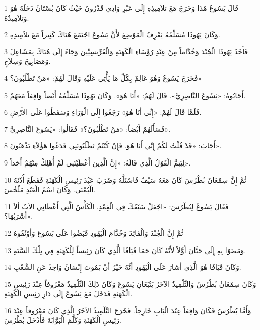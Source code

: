 \par 1 قَالَ يَسُوعُ هَذَا وَخَرَجَ مَعَ تلاَمِيذِهِ إِلَى عَبْرِ وَادِي قَدْرُونَ حَيْثُ كَانَ بُسْتَانٌ دَخَلَهُ هُوَ وَتلاَمِيذُهُ.
\par 2 وَكَانَ يَهُوذَا مُسَلِّمُهُ يَعْرِفُ الْمَوْضِعَ لأَنَّ يَسُوعَ اجْتَمَعَ هُنَاكَ كَثِيراً مَعَ تلاَمِيذِهِ.
\par 3 فَأَخَذَ يَهُوذَا الْجُنْدَ وَخُدَّاماً مِنْ عِنْدِ رُؤَسَاءِ الْكَهَنَةِ وَالْفَرِّيسِيِّينَ وَجَاءَ إِلَى هُنَاكَ بِمَشَاعِلَ وَمَصَابِيحَ وَسِلاَحٍ.
\par 4 فَخَرَجَ يَسُوعُ وَهُوَ عَالِمٌ بِكُلِّ مَا يَأْتِي عَلَيْهِ وَقَالَ لَهُمْ: «مَنْ تَطْلُبُونَ؟»
\par 5 أَجَابُوهُ: «يَسُوعَ النَّاصِرِيَّ». قَالَ لَهُمْ: «أَنَا هُوَ». وَكَانَ يَهُوذَا مُسَلِّمُهُ أَيْضاً وَاقِفاً مَعَهُمْ.
\par 6 فَلَمَّا قَالَ لَهُمْ: «إِنِّي أَنَا هُوَ» رَجَعُوا إِلَى الْوَرَاءِ وَسَقَطُوا عَلَى الأَرْضِ.
\par 7 فَسَأَلَهُمْ أَيْضاً: «مَنْ تَطْلُبُونَ؟» فَقَالُوا: «يَسُوعَ النَّاصِرِيَّ».
\par 8 أَجَابَ: «قَدْ قُلْتُ لَكُمْ إِنِّي أَنَا هُوَ. فَإِنْ كُنْتُمْ تَطْلُبُونَنِي فَدَعُوا هَؤُلاَءِ يَذْهَبُونَ».
\par 9 لِيَتِمَّ الْقَوْلُ الَّذِي قَالَهُ: «إِنَّ الَّذِينَ أَعْطَيْتَنِي لَمْ أُهْلِكْ مِنْهُمْ أَحَداً».
\par 10 ثُمَّ إِنَّ سِمْعَانَ بُطْرُسَ كَانَ مَعَهُ سَيْفٌ فَاسْتَلَّهُ وَضَرَبَ عَبْدَ رَئِيسِ الْكَهَنَةِ فَقَطَعَ أُذْنَهُ الْيُمْنَى. وَكَانَ اسْمُ الْعَبْدِ مَلْخُسَ.
\par 11 فَقَالَ يَسُوعُ لِبُطْرُسَ: «اجْعَلْ سَيْفَكَ فِي الْغِمْدِ. الْكَأْسُ الَّتِي أَعْطَانِي الآبُ ألاَ أَشْرَبُهَا؟».
\par 12 ثُمَّ إِنَّ الْجُنْدَ وَالْقَائِدَ وَخُدَّامَ الْيَهُودِ قَبَضُوا عَلَى يَسُوعَ وَأَوْثَقُوهُ
\par 13 وَمَضَوْا بِهِ إِلَى حَنَّانَ أَوَّلاً لأَنَّهُ كَانَ حَمَا قَيَافَا الَّذِي كَانَ رَئِيساً لِلْكَهَنَةِ فِي تِلْكَ السَّنَةِ.
\par 14 وَكَانَ قَيَافَا هُوَ الَّذِي أَشَارَ عَلَى الْيَهُودِ أَنَّهُ خَيْرٌ أَنْ يَمُوتَ إِنْسَانٌ وَاحِدٌ عَنِ الشَّعْبِ.
\par 15 وَكَانَ سِمْعَانُ بُطْرُسُ وَالتِّلْمِيذُ الآخَرُ يَتْبَعَانِ يَسُوعَ وَكَانَ ذَلِكَ التِّلْمِيذُ مَعْرُوفاً عِنْدَ رَئِيسِ الْكَهَنَةِ فَدَخَلَ مَعَ يَسُوعَ إِلَى دَارِ رَئِيسِ الْكَهَنَةِ.
\par 16 وَأَمَّا بُطْرُسُ فَكَانَ وَاقِفاً عِنْدَ الْبَابِ خَارِجاً. فَخَرَجَ التِّلْمِيذُ الآخَرُ الَّذِي كَانَ مَعْرُوفاً عِنْدَ رَئِيسِ الْكَهَنَةِ وَكَلَّمَ الْبَوَّابَةَ فَأَدْخَلَ بُطْرُسَ.
